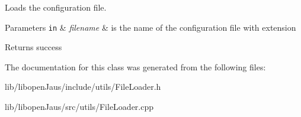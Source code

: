 \-Loads the configuration file. 


\begin{DoxyParams}[1]{\-Parameters}
\mbox{\tt in}  & {\em filename} & is the name of the configuration file with extension \\
\hline
\end{DoxyParams}
\begin{DoxyReturn}{\-Returns}
success 
\end{DoxyReturn}


\-The documentation for this class was generated from the following files\-:\begin{DoxyCompactItemize}
\item 
lib/libopen\-Jaus/include/utils/\-File\-Loader.\-h\item 
lib/libopen\-Jaus/src/utils/\-File\-Loader.\-cpp\end{DoxyCompactItemize}
